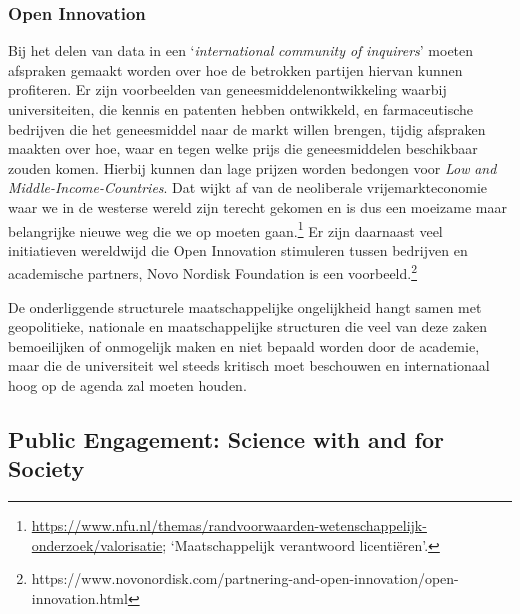 \documentclass[smallauthor, chapterhaspagenum, nochapterinheader, pagenuminheader,  bigchapnum,medium2, tocpages,  garamond, titleinheader]{jote-book}
\begin{document}
	\subsubsection{Open Innovation}



	Bij het delen van data in een ‘\emph{international}\emph{ community of }\emph{inquirers}' moeten afspraken gemaakt worden over hoe de betrokken partijen hiervan kunnen profiteren. Er zijn voorbeelden van geneesmiddelenontwikkeling waarbij universiteiten, die kennis en patenten hebben ontwikkeld, en farmaceutische bedrijven die het geneesmiddel naar de markt willen brengen, tijdig afspraken maakten over hoe, waar en tegen welke prijs die geneesmiddelen beschikbaar zouden komen. Hierbij kunnen dan lage prijzen worden bedongen voor \emph{Low }\emph{and}\emph{ }\emph{Middle-Income-Countries}. Dat wijkt af van de neoliberale vrijemarkteconomie waar we in de westerse wereld zijn terecht gekomen en is dus een moeizame maar belangrijke nieuwe weg die we op moeten gaan.\footnote{\href{https://www.nfu.nl/themas/randvoorwaarden-wetenschappelijk-onderzoek/valorisatie}{https://www.nfu.nl/themas/randvoorwaarden-wetenschappelijk-onderzoek/valorisatie}; ‘Maatschappelijk verantwoord licentiëren'.} Er zijn daarnaast veel initiatieven wereldwijd die Open Innovation stimuleren tussen bedrijven en academische partners, Novo Nordisk Foundation is een voorbeeld.\footnote{https://www.novonordisk.com/partnering-and-open-innovation/open-innovation.html}



	De onderliggende structurele maatschappelijke ongelijkheid hangt samen met geopolitieke, nationale en maatschappelijke structuren die veel van deze zaken bemoeilijken of onmogelijk maken en niet bepaald worden door de academie, maar die de universiteit wel steeds kritisch moet beschouwen en internationaal hoog op de agenda zal moeten houden.



	\subsection{Public Engagement: Science with and for Society }
\end{document}
